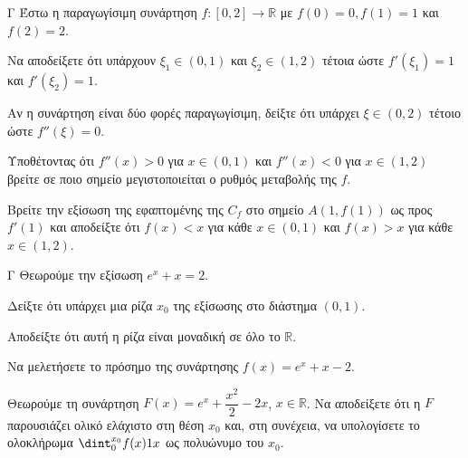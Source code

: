 \begin{thema}{Γ}
Έστω η παραγωγίσιμη συνάρτηση $f: [0, 2] \to \mathbb{R}$ με $f(0)=0, f(1)=1$ και $f(2)=2$.
\begin{erwthma}
  \item Να αποδείξετε ότι υπάρχουν $\xi_1 \in (0, 1)$ και $\xi_2 \in (1, 2)$ τέτοια ώστε $f'(\xi_1) = 1$ και $f'(\xi_2) = 1$.
  \item Αν η συνάρτηση είναι δύο φορές παραγωγίσιμη, δείξτε ότι υπάρχει $\xi\in(0,2)$ τέτοιο ώστε $f''(\xi)=0$.
  \item Υποθέτοντας ότι $f''(x) > 0$ για $x \in (0,1)$ και $f''(x) < 0$ για $x \in (1,2)$ βρείτε σε ποιο σημείο μεγιστοποιείται ο ρυθμός μεταβολής της $f$.
  \item Βρείτε την εξίσωση της εφαπτομένης της $C_f$ στο σημείο $A(1,f(1))$ ως προς $f'(1)$ και αποδείξτε ότι $f(x) < x$ για κάθε $x \in (0, 1)$ και $f(x) > x$ για κάθε $x \in (1, 2)$.
\end{erwthma}
\end{thema}

\begin{thema}{Γ}
Θεωρούμε την εξίσωση $e^x + x = 2$.
\begin{erwthma}
  \item Δείξτε ότι υπάρχει μια ρίζα $x_0$ της εξίσωσης στο διάστημα $(0, 1)$.
  \item Αποδείξτε ότι αυτή η ρίζα είναι μοναδική σε όλο το $\mathbb{R}$.
  \item Να μελετήσετε το πρόσημο της συνάρτησης $f(x)=e^x+x-2$.
  \item Θεωρούμε τη συνάρτηση $F(x) = e^x + \dfrac{x^2}{2} - 2x$, $x \in \mathbb{R}$. Να αποδείξετε ότι η $F$ παρουσιάζει ολικό ελάχιστο στη θέση $x_0$ και, στη συνέχεια, να υπολογίσετε το ολοκλήρωμα $\dint_0^{x_0} f(x) \d x$ ως πολυώνυμο του $x_0$.
\end{erwthma}
\end{thema}

